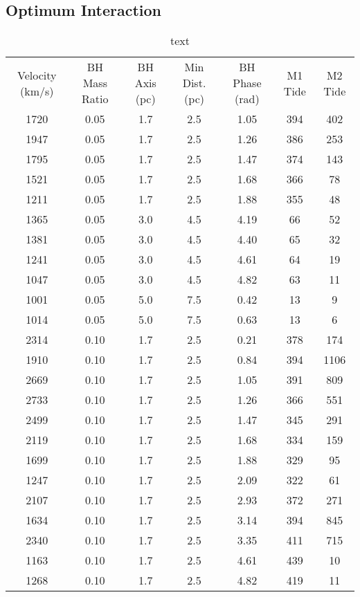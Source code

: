 \documentclass{aastex62}
\begin{document}
\subsection{Optimum Interaction}
\begin{table}
\centering
\caption{text\label{key}}

\begin{tabular}{ccccccc}
\hline \hline
Velocity (km/s) & BH Mass Ratio & BH Axis (pc) & Min Dist. (pc) & BH Phase (rad) & M1 Tide & M2 Tide \\
1720 & 0.05 & 1.7 & 2.5 & 1.05 & 394 & 402 \\ 
1947 & 0.05 & 1.7 & 2.5 & 1.26 & 386 & 253 \\ 
1795 & 0.05 & 1.7 & 2.5 & 1.47 & 374 & 143 \\ 
1521 & 0.05 & 1.7 & 2.5 & 1.68 & 366 & 78 \\ 
1211 & 0.05 & 1.7 & 2.5 & 1.88 & 355 & 48 \\ 
1365 & 0.05 & 3.0 & 4.5 & 4.19 & 66 & 52 \\ 
1381 & 0.05 & 3.0 & 4.5 & 4.40 & 65 & 32 \\ 
1241 & 0.05 & 3.0 & 4.5 & 4.61 & 64 & 19 \\ 
1047 & 0.05 & 3.0 & 4.5 & 4.82 & 63 & 11 \\ 
1001 & 0.05 & 5.0 & 7.5 & 0.42 & 13 & 9 \\ 
1014 & 0.05 & 5.0 & 7.5 & 0.63 & 13 & 6 \\ 
2314 & 0.10 & 1.7 & 2.5 & 0.21 & 378 & 174 \\ 
1910 & 0.10 & 1.7 & 2.5 & 0.84 & 394 & 1106 \\ 
2669 & 0.10 & 1.7 & 2.5 & 1.05 & 391 & 809 \\ 
2733 & 0.10 & 1.7 & 2.5 & 1.26 & 366 & 551 \\ 
2499 & 0.10 & 1.7 & 2.5 & 1.47 & 345 & 291 \\ 
2119 & 0.10 & 1.7 & 2.5 & 1.68 & 334 & 159 \\ 
1699 & 0.10 & 1.7 & 2.5 & 1.88 & 329 & 95 \\ 
1247 & 0.10 & 1.7 & 2.5 & 2.09 & 322 & 61 \\ 
2107 & 0.10 & 1.7 & 2.5 & 2.93 & 372 & 271 \\ 
1634 & 0.10 & 1.7 & 2.5 & 3.14 & 394 & 845 \\ 
2340 & 0.10 & 1.7 & 2.5 & 3.35 & 411 & 715 \\ 
1163 & 0.10 & 1.7 & 2.5 & 4.61 & 439 & 10 \\ 
1268 & 0.10 & 1.7 & 2.5 & 4.82 & 419 & 11 \\ 

\end{tabular}
\end{table}
\end{document}
